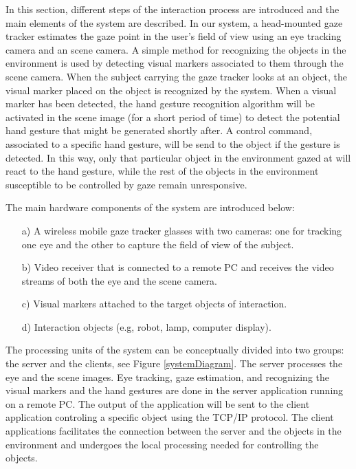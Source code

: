 \documentclass[jou,a4paper,notxfonts]{apa}
\begin{document}
In this section, different steps of the interaction process are introduced and the main elements of the system are described. 
In our system, a head-mounted gaze tracker estimates the gaze point in the user's field of view using an eye tracking camera and an scene camera. A simple method for recognizing the objects in the environment is used by detecting visual markers associated to them through the scene camera. When the subject carrying the gaze tracker looks at an object, the visual marker placed on the object is recognized by the system. When a visual marker has been detected, the hand gesture recognition algorithm will be activated in the scene image (for a short period of time) to detect the potential hand gesture that might be generated shortly after. A control command, associated to a specific hand gesture, will be send to the object if the gesture is detected. In this way, only that particular object in the environment gazed at will react to the hand gesture, while the rest of the objects in the environment susceptible to be controlled by gaze remain unresponsive.

The main hardware components of the system are introduced below:
\begin{enumerate}
\item[a)] A wireless mobile gaze tracker glasses with two cameras: one for tracking one eye and the other to capture the field of view of the subject. 
\item[b)] Video receiver that is connected to a remote PC and receives the video streams of both the eye and the scene camera.
\item[c)] Visual markers attached to the target objects of interaction. 
\item[d)] Interaction objects (e.g, robot, lamp, computer display).

\end{enumerate}

The processing units of the system can be conceptually divided into two groups: the server and the clients, see Figure \ref{systemDiagram}. The server processes the eye and the scene images. Eye tracking, gaze estimation, and recognizing the visual markers and the hand gestures are done in the server application running on a remote PC. The output of the application will be sent to the client application controling a specific object using the TCP/IP protocol. The client applications facilitates the connection between the server and the objects in the environment and undergoes the local processing needed for controlling the objects. 
\end{document}
